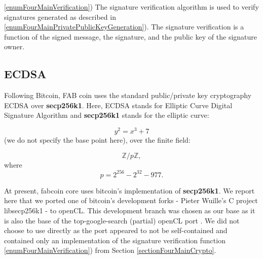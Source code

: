 \documentclass{article}
\newcommand{\secpTwoFiveSixKone}{{\bf secp256k1}}
\begin{document}
\noindent\ref{enumFourMainVerification}) The signature verification algorithm is used to verify signatures generated as described in \ref{enumFourMainPrivatePublicKeyGeneration}). The signature verification is a function of the signed message, the signature, and the public key of the signature owner.

\subsection{ECDSA}\label{sectionECDSAgeneral}
Following Bitcoin, FAB coin uses the standard public/private key cryptography ECDSA over \secpTwoFiveSixKone. Here, ECDSA stands for Elliptic Curve Digital Signature Algorithm and \secpTwoFiveSixKone{} stands for the elliptic curve:

\[
y^2 = x^3 + 7
\]
(we do not specify the base point here), over the finite field:

\[
\mathbb Z / p\mathbb Z, 
\]
where
\begin{equation}\label{eqThePrime}
p= 2^{256} - 2^{32} - 977.
\end{equation}

At present, fabcoin core uses bitcoin's implementation of \secpTwoFiveSixKone{}. We report here that we ported one of bitcoin's development forks - Pieter Wuille's C project libsecp256k1 \cite{Wuille:secp256k1}  - to openCL. This development branch was chosen as our base as it is also the base of the top-google-search (partial) openCL port \cite{secp256k1:openCLimplementationHanh0}. We did not choose to use \cite{secp256k1:openCLimplementationHanh0} directly as the port appeared to not be self-contained and contained only an implementation of the signature verification function \ref{enumFourMainVerification})  from Section \ref{sectionFourMainCrypto}.




\end{document}
